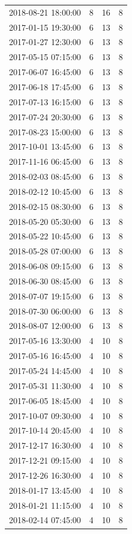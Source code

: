 \begin{tabular}{lrrr}
2018-08-21 18:00:00 & 8 & 16 & 8 \\
2017-01-15 19:30:00 & 6 & 13 & 8 \\
2017-01-27 12:30:00 & 6 & 13 & 8 \\
2017-05-15 07:15:00 & 6 & 13 & 8 \\
2017-06-07 16:45:00 & 6 & 13 & 8 \\
2017-06-18 17:45:00 & 6 & 13 & 8 \\
2017-07-13 16:15:00 & 6 & 13 & 8 \\
2017-07-24 20:30:00 & 6 & 13 & 8 \\
2017-08-23 15:00:00 & 6 & 13 & 8 \\
2017-10-01 13:45:00 & 6 & 13 & 8 \\
2017-11-16 06:45:00 & 6 & 13 & 8 \\
2018-02-03 08:45:00 & 6 & 13 & 8 \\
2018-02-12 10:45:00 & 6 & 13 & 8 \\
2018-02-15 08:30:00 & 6 & 13 & 8 \\
2018-05-20 05:30:00 & 6 & 13 & 8 \\
2018-05-22 10:45:00 & 6 & 13 & 8 \\
2018-05-28 07:00:00 & 6 & 13 & 8 \\
2018-06-08 09:15:00 & 6 & 13 & 8 \\
2018-06-30 08:45:00 & 6 & 13 & 8 \\
2018-07-07 19:15:00 & 6 & 13 & 8 \\
2018-07-30 06:00:00 & 6 & 13 & 8 \\
2018-08-07 12:00:00 & 6 & 13 & 8 \\
2017-05-16 13:30:00 & 4 & 10 & 8 \\
2017-05-16 16:45:00 & 4 & 10 & 8 \\
2017-05-24 14:45:00 & 4 & 10 & 8 \\
2017-05-31 11:30:00 & 4 & 10 & 8 \\
2017-06-05 18:45:00 & 4 & 10 & 8 \\
2017-10-07 09:30:00 & 4 & 10 & 8 \\
2017-10-14 20:45:00 & 4 & 10 & 8 \\
2017-12-17 16:30:00 & 4 & 10 & 8 \\
2017-12-21 09:15:00 & 4 & 10 & 8 \\
2017-12-26 16:30:00 & 4 & 10 & 8 \\
2018-01-17 13:45:00 & 4 & 10 & 8 \\
2018-01-21 11:15:00 & 4 & 10 & 8 \\
2018-02-14 07:45:00 & 4 & 10 & 8 \\

\end{tabular}
